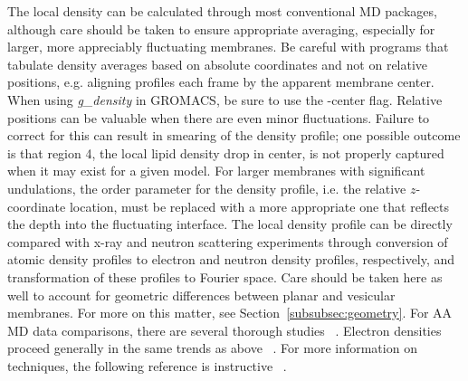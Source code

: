 \documentclass[9pt,bestpractices,pubversion]{livecoms}
\begin{document}
The local density can be calculated through most conventional MD packages, although care should be taken to ensure appropriate averaging, especially for larger, more appreciably fluctuating membranes.
Be careful with programs that tabulate density averages based on absolute coordinates and not on relative positions, e.g. aligning profiles each frame by the apparent membrane center.
When using \textit{g\_density} in GROMACS, be sure to use the -center flag.
Relative positions can be valuable when there are even minor fluctuations.
Failure to correct for this can result in smearing of the density profile; one possible outcome is that region 4, the local lipid density drop in center, is not properly captured when it may exist for a given model.
For larger membranes with significant undulations, the order parameter for the density profile, i.e. the relative $z$-coordinate location, must be replaced with a more appropriate one that reflects the depth into the fluctuating interface.
The local density profile can be directly compared with x-ray and neutron scattering experiments through conversion of atomic density profiles to electron and neutron density profiles, respectively, and transformation of these profiles to Fourier space.
Care should be taken here as well to account for geometric differences between planar and vesicular membranes.
For more on this matter, see Section~\ref{subsubsec:geometry}.
For AA MD data comparisons, there are several thorough studies ~\cite{Braun2011,Klauda2006a}.
Electron densities proceed generally in the same trends as above ~\cite{Klauda2010d}.
For more information on techniques, the following reference is instructive ~\cite{Poger2016}.
\end{document}
